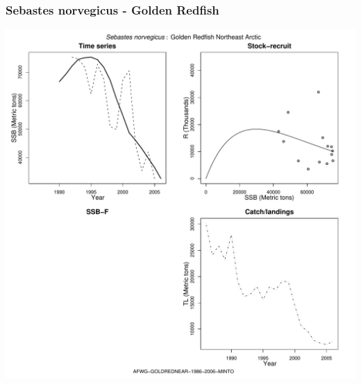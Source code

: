\subsubsection{Sebastes norvegicus - Golden Redfish}
\begin{center}
\includegraphics[width=1.2\textwidth]{../R/figures/AFWG-GOLDREDNEAR-1986-2006-MINTO.pdf}
\end{center}

